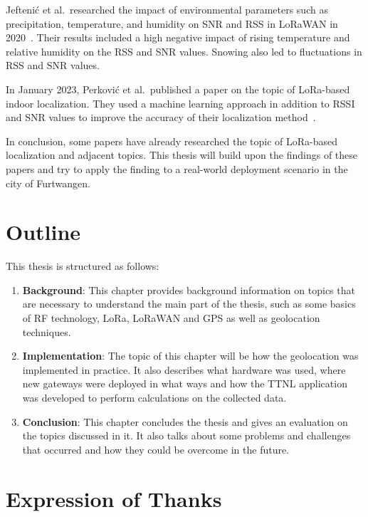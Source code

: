 Jeftenić et al.\ researched the impact of environmental parameters such as precipitation, temperature, and humidity on \ac{SNR} and \ac{RSS} in \ac{LoRaWAN} in 2020~\cite{jeftenic_impact_2020}.
Their results included a high negative impact of rising temperature and relative humidity on the \ac{RSS} and \ac{SNR} values.
Snowing also led to fluctuations in \ac{RSS} and \ac{SNR} values.

In January 2023, Perković et al.\ published a paper on the topic of \ac{LoRa}-based indoor localization.
They used a machine learning approach in addition to \ac{RSSI} and \ac{SNR} values to improve the accuracy of their localization method~\cite{perkovic_machine_2023}.

In conclusion, some papers have already researched the topic of \ac{LoRa}-based localization and adjacent topics.
This thesis will build upon the findings of these papers and try to apply the finding to a real-world deployment scenario in the city of Furtwangen.

\section{Outline}

This thesis is structured as follows:

\begin{enumerate}
      \item \textbf{Background}:
            This chapter provides background information on topics that are necessary to understand the main part of the thesis, such as some basics of \ac{RF} technology, \ac{LoRa}, \ac{LoRaWAN} and \ac{GPS} as well as geolocation techniques.
      \item \textbf{Implementation}:
            The topic of this chapter will be how the geolocation was implemented in practice.
            It also describes what hardware was used, where new gateways were deployed in what ways and how the \ac{TTNL} application was developed to perform calculations on the collected data.
      \item \textbf{Conclusion}:
            This chapter concludes the thesis and gives an evaluation on the topics discussed in it.
            It also talks about some problems and challenges that occurred and how they could be overcome in the future.
\end{enumerate}


\section{Expression of Thanks}\label{sec:expression-of-thanks}

